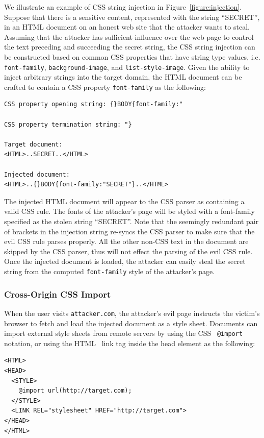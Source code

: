 \documentclass{acm_proc_article-sp}
\begin{document}
We illustrate an example of CSS string injection in Figure~\ref{figure:injection}. Suppose that there is a sensitive content, represented with the string ``SECRET'', in an HTML document on an honest web site that the attacker wants to steal. Assuming that the attacker has sufficient influence over the web page to control the text preceding and succeeding the secret string, the CSS string injection can be constructed based on common CSS properties that have string type values, i.e. \texttt{font-family}, \texttt{background-image}, and \texttt{list-style-image}. Given the ability to inject arbitrary strings into the target domain, the HTML document can be crafted to contain a CSS property \texttt{font-family} as the following:
\begin{verbatim}
CSS property opening string: {}BODY{font-family:"

CSS property termination string: "}

Target document:
<HTML>..SECRET..</HTML>

Injected document:
<HTML>..{}BODY{font-family:"SECRET"}..</HTML>
\end{verbatim}
The injected HTML document will appear to the CSS parser as containing a valid CSS rule. The fonts of the attacker's page will be styled with a font-family specified as the stolen string ``SECRET''. Note that the seemingly redundant pair of brackets in the injection string re-syncs the CSS parser to make sure that the evil CSS rule parses properly. All the other non-CSS text in the document are skipped by the CSS parser, thus will not effect the parsing of the evil CSS rule. Once the injected document is loaded, the attacker can easily steal the secret string from the computed \texttt{font-family} style of the attacker's page.

\subsubsection{Cross-Origin CSS Import}
When the user visits \texttt{attacker.com}, the attacker's evil page instructs the victim's browser to fetch and load the injected document as a style sheet. Documents can import external style sheets from remote servers by using the CSS~\cite{css} \texttt{@import} notation, or using the HTML~\cite{html} link tag inside the head element as the following:
\begin{verbatim}
<HTML>
<HEAD>
  <STYLE>
    @import url(http://target.com);
  </STYLE>
  <LINK REL="stylesheet" HREF="http://target.com">
</HEAD>
</HTML>
\end{verbatim}
\end{document}
